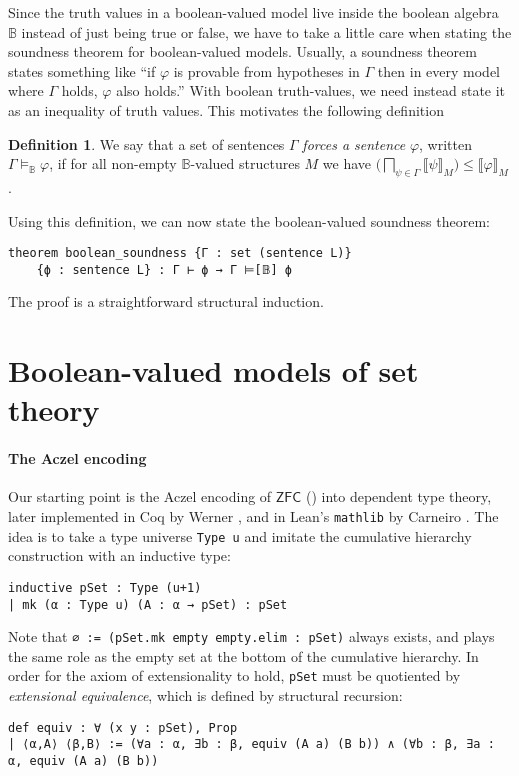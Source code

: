 \documentclass[sigplan,10pt,review, anonymous]{acmart}
\newcommand{\B}{\mathbb{B}}
\theoremstyle{definition}
\newtheorem{defn}{Definition}[section]
\begin{document}
Since the truth values in a boolean-valued model live inside the boolean algebra $\B$ instead of just being true or false, we have to take a little care when stating the soundness theorem for boolean-valued models.
Usually, a soundness theorem states something like ``if $\varphi$ is provable from hypotheses in $\Gamma$ then in every model where $\Gamma$ holds, $\varphi$ also holds.''
With boolean truth-values, we need instead state it as an inequality of truth values. This motivates the following definition
\begin{defn}
We say that a set of sentences $\Gamma$ \emph{forces a sentence} $\varphi$, written $\Gamma \models_{\B}\varphi$, if for all non-empty $\B$-valued structures $M$ we have $\big(\bigsqcap_{\psi\in\Gamma}\big \llbracket \psi \rrbracket_M)\le\llbracket \varphi \rrbracket_M$.
\end{defn}
Using this definition, we can now state the boolean-valued soundness theorem:
\begin{lstlisting}
theorem boolean_soundness {Γ : set (sentence L)}
    {ϕ : sentence L} : Γ ⊢ ϕ → Γ ⊨[𝔹] ϕ
\end{lstlisting}
The proof is a straightforward structural induction.

\section{Boolean-valued models of set theory}
\label{subsection:fol:bset}
\paragraph{The Aczel encoding}
Our starting point is the Aczel encoding of \(\mathsf{ZFC}\) (\cite{aczel1978type, aczel1986type, aczel1982type}) into dependent type theory, later implemented in Coq by Werner \cite{werner1997sets}, and in Lean's \lstinline{mathlib} by Carneiro \cite{mario1}. The idea is to take a type universe \lstinline{Type u} and imitate the cumulative hierarchy construction with an inductive type:
\begin{lstlisting}
inductive pSet : Type (u+1)
| mk (α : Type u) (A : α → pSet) : pSet
\end{lstlisting}
Note that \lstinline{∅ := (pSet.mk empty empty.elim : pSet)} always exists, and plays the same role as the empty set at the bottom of the cumulative hierarchy. In order for the axiom of extensionality to hold, \lstinline{pSet} must be quotiented by \emph{extensional equivalence}, which is defined by structural recursion:
\begin{lstlisting}[basicstyle=\ttfamily\small]
def equiv : ∀ (x y : pSet), Prop
| ⟨α,A⟩ ⟨β,B⟩ := (∀a : α, ∃b : β, equiv (A a) (B b)) ∧ (∀b : β, ∃a : α, equiv (A a) (B b))
\end{lstlisting}
\end{document}
